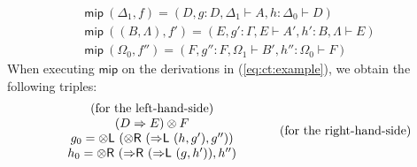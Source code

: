 \documentclass[a4paper,UKenglish,cleveref,autoref,thm-restate, anonymous]{lipics-v2021}
\newcommand{\ot}{\otimes}
\newcommand{\Rarr}{\Rightarrow}
\newcommand{\mf}[1]{\mathsf{#1}}
\newcommand{\GG}{\Gamma}
\newcommand{\GD}{\Delta}
\newcommand{\GL}{\Lambda}
\newcommand{\GO}{\Omega}
\newcommand{\vd}{\vdash}
\newcommand{\tl}{{\otimes}\mathsf{L}}
\newcommand{\tr}{{\otimes}\mathsf{R}}
\newcommand{\Rl}{{\Rarr}\mathsf{L}}
\newcommand{\Rr}{{\Rarr}\mathsf{R}}
\begin{document}
\begin{example}
\[
\begin{array}{l}
\mf{mip}\ (\GD_1,f) = (D , g : D , \GD_1 \vd A , h : \GD_0 \vd D)
\\[3pt]
\mf{mip}\ ((B,\Lambda),f') = (E , g' : \GG , E \vd A' , h' : B , \GL \vd E)
\\[3pt]
\mf{mip}\ (\GO_0,f'') = (F , g'' : F , \GO_1 \vd B' , h'' : \GO_0 \vd F)
\end{array}
\]
When executing $\mf{mip}$ on the derivations in (\ref{eq:ct:example}), we obtain the following triples:
\[
\begin{array}{lr}
\arraycolsep=20pt
  \begin{array}{c}
    \text{(for the left-hand-side)}
    \\
    (D \Rarr E) \ot F
    \\
    g_0 = \tl \ (\tr \ (\Rl \ (h , g') , g'')) 
    \\
    h_0 = \tr\ (\Rr \ (\Rl \ (g , h')), h'')
  \end{array}
  &
  \begin{array}{c}
    \text{(for the right-hand-side)}

\end{array}
\end{array}\]
\end{example}
\end{document}
